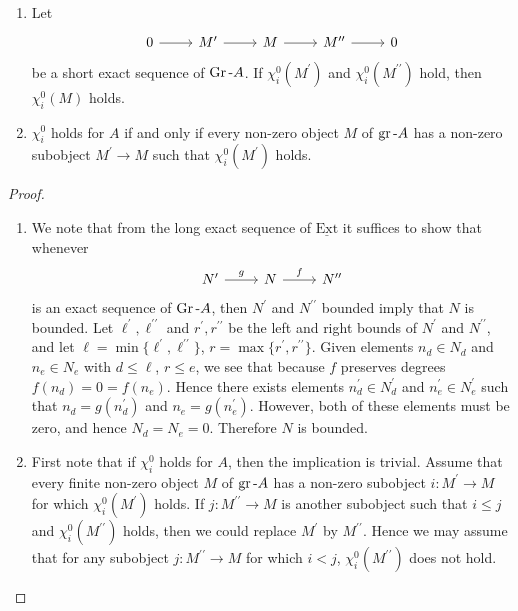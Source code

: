 \documentclass[dissertation.tex]{subfiles}
\begin{document}
\begin{prop}
  \begin{prop}
    \begin{enumerate}
    \item
      Let
      $$\begin{tikzcd}
        0 \arrow{r} & M^\prime \arrow{r} & M \arrow{r} & M^{\prime\prime} \arrow{r} & 0
      \end{tikzcd}$$
      be a short exact sequence of $\operatorname{Gr}\text{-}A$.
      If $\chi^0_i(M^\prime)$ and $\chi^0_i(M^{\prime\prime})$ hold, then $\chi^0_i(M)$ holds.
    \item
      $\chi^0_i$ holds for $A$ if and only if every non-zero object $M$ of $\operatorname{gr}\text{-}A$ has a non-zero subobject $M^\prime \rightarrow M$ such that $\chi^0_i(M^\prime)$ holds.
    \end{enumerate}
    \begin{proof}
      \begin{enumerate}
      \item
        We note that from the long exact sequence of $\operatorname{\underline{Ext}}$ it suffices to show that whenever
        $$\begin{tikzcd}
          N^\prime \arrow{r}{g} & N \arrow{r}{f} & N^{\prime\prime}
        \end{tikzcd}$$
        is an exact sequence of $\operatorname{Gr}\text{-}A$, then $N^\prime$ and $N^{\prime\prime}$ bounded imply that $N$ is bounded.
        Let $\ell^\prime, \ell^{\prime\prime}$ and $r^\prime, r^{\prime\prime}$ be the left and right bounds of $N^\prime$ and $N^{\prime\prime}$, and let $\ell = \min\{\ell^\prime, \ell^{\prime\prime}\}$, $r = \max\{r^\prime, r^{\prime\prime}\}$.
        Given elements $n_d \in N_d$ and $n_e \in N_e$ with $d \leq \ell$, $r \leq e$, we see that because $f$ preserves degrees $f(n_d) = 0 = f(n_e)$.
        Hence there exists elements $n^\prime_d \in N^\prime_d$ and $n^\prime_e \in N^\prime_e$ such that $n_d = g(n^\prime_d)$ and $n_e = g(n^\prime_e)$.
        However, both of these elements must be zero, and hence $N_d = N_e = 0$.
        Therefore $N$ is bounded.
      \item
        First note that if $\chi^0_i$ holds for $A$, then the implication is trivial.
        Assume that every finite non-zero object $M$ of $\operatorname{gr}\text{-}A$ has a non-zero subobject $i \colon M^\prime \rightarrow M$ for which $\chi^0_i(M^\prime)$ holds.
        If $j \colon M^{\prime\prime} \rightarrow M$ is another subobject such that $i \leq j$ and  $\chi^0_i(M^{\prime\prime})$ holds, then we could replace $M^\prime$ by $M^{\prime\prime}$.
        Hence we may assume that for any subobject $j \colon M^{\prime\prime} \rightarrow M$ for which $i < j$, $\chi^0_i(M^{\prime\prime})$ does not hold.
        

\end{enumerate}
\end{proof}
\end{prop}
\end{prop}
\end{document}

